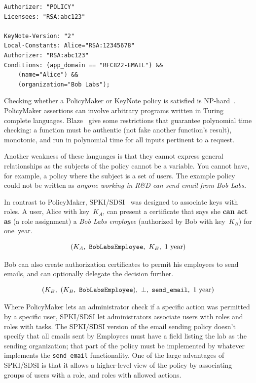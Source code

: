 \documentclass[thesis.tex]{subfiles}
\begin{document}
\begin{lstlisting}
Authorizer: "POLICY"
Licensees: "RSA:abc123"

KeyNote-Version: "2"
Local-Constants: Alice="RSA:12345678" 
Authorizer: "RSA:abc123"
Conditions: (app_domain == "RFC822-EMAIL") &&
    (name="Alice") &&
    (organization="Bob Labs");
\end{lstlisting}

Checking whether a PolicyMaker or KeyNote policy is satisfied is
NP-hard~\cite{blaze_compliance_1998}. PolicyMaker assertions can involve
arbitrary programs written in Turing complete languages. Blaze~\etal{} give some restrictions that
guarantee polynomial time checking: a function must be authentic (not fake
another function's result), monotonic, and run in polynomial time for all inputs
pertinent to a request.

Another weakness of these languages is that they cannot express
general relationships as the subjects of the policy cannot be a
variable.  You cannot have, for example, a policy where the subject is
a set of users.  The example policy could not be written as
\emph{anyone working in R\&D can send email from Bob Labs.}


In contrast to PolicyMaker, SPKI/SDSI~\cite{ellison_spki_1999} was
designed to associate keys with roles.  A user, Alice with key~$K_A$,
can present a certificate that says she \textbf{can act as} (a role assignment) a \emph{Bob Labs
employee} (authorized by Bob with key~$K_B$) for one~year.

\begin{equation*}
  (K_A,~\text{\tt BobLabsEmployee},~K_B,~1~\text{year})
\end{equation*}

Bob can also create authorization certificates to permit his employees
to send emails, and can optionally delegate the decision further.

\begin{equation*}
 (K_B,~(K_B,~\text{\tt BobLabsEmployee}),~\bot,~\text{\ttfamily send\_email},~1~\text{year})
\end{equation*}

Where PolicyMaker lets an administrator check if a specific action was permitted
by a specific user, SPKI/SDSI let administrators associate users with roles and
roles with tasks. The SPKI/SDSI version of the email sending policy doesn't
specify that all emails sent by Employees must have a field listing the lab as
the sending organization; that part of the policy must be implemented by
whatever implements the \texttt{send\_email} functionality. One of the large
advantages of SPKI/SDSI is that it allows a higher-level view of the policy by
associating groups of users with a role, and roles with allowed actions.
\end{document}
